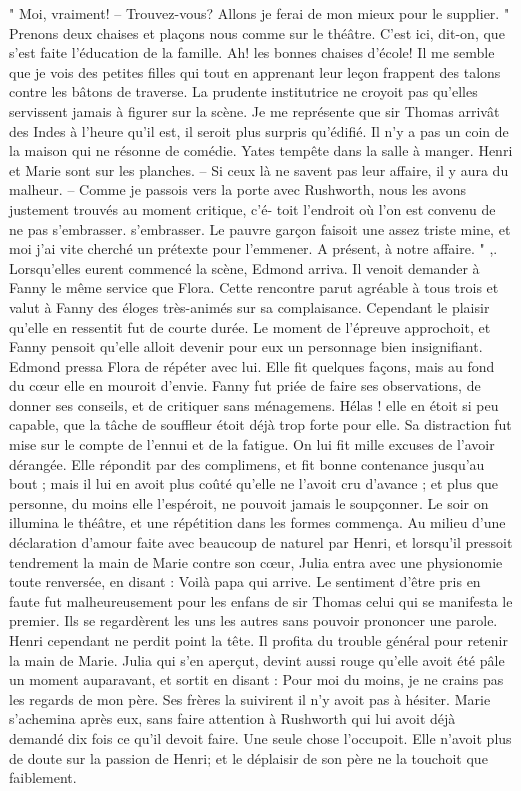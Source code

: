 " Moi, vraiment! – Trouvez-vous? Allons je ferai de mon mieux pour le supplier.
" Prenons deux chaises et plaçons nous comme sur le théâtre. C’est ici, dit-on, que s’est faite l’éducation de la famille. Ah! les bonnes chaises d’école! Il me semble que je vois des petites filles qui tout en apprenant leur leçon frappent des talons contre les bâtons de traverse. La prudente institutrice ne croyoit pas qu’elles servissent jamais à figurer sur la scène. Je me représente que sir Thomas arrivât des Indes à l’heure qu’il est, il seroit plus surpris qu’édifié. Il n’y a pas un coin de la maison qui ne résonne de comédie. Yates tempête dans la salle à manger. Henri et Marie sont sur les planches. – Si ceux là ne savent pas leur affaire, il y aura du malheur. – Comme je passois vers la porte avec Rushworth, nous les avons justement trouvés au moment critique, c’é- toit l’endroit où l’on est convenu de ne pas s’embrasser.\setcounter{page}{129} s'embrasser. Le pauvre garçon faisoit une assez triste mine, et moi j'ai vite cherché un prétexte pour l'emmener. A présent, à notre affaire. "
,. Lorsqu'elles eurent commencé la scène, Edmond arriva. Il venoit demander à Fanny le même service que Flora. Cette rencontre parut agréable à tous trois et valut à Fanny des éloges très-animés sur sa complaisance. Cependant le plaisir qu'elle en ressentit fut de courte durée. Le moment de l'épreuve approchoit, et Fanny pensoit qu'elle alloit devenir pour eux un personnage bien insignifiant. Edmond pressa Flora de répéter avec lui. Elle fit quelques façons, mais au fond du cœur elle en mouroit d'envie. Fanny fut priée de faire ses observations, de donner ses conseils, et de critiquer sans ménagemens. Hélas ! elle en étoit si peu capable, que la tâche de souffleur étoit déjà trop forte pour elle. Sa distraction fut mise sur le compte de l'ennui et de la fatigue. On lui fit mille excuses de l'avoir dérangée. Elle répondit par des complimens, et fit bonne contenance jusqu'au bout ; mais il lui en avoit plus coûté qu'elle ne l'avoit cru d'avance ; et plus que personne, du moins elle l'espéroit, ne pouvoit jamais le soupçonner.\setcounter{page}{130} Le soir on illumina le théâtre, et une répétition dans les formes commença. Au milieu d'une déclaration d'amour faite avec beaucoup de naturel par Henri, et lorsqu'il pressoit tendrement la main de Marie contre son cœur, Julia entra avec une physionomie toute renversée, en disant : Voilà papa qui arrive.
Le sentiment d'être pris en faute fut malheureusement pour les enfans de sir Thomas celui qui se manifesta le premier. Ils se regardèrent les uns les autres sans pouvoir prononcer une parole. Henri cependant ne perdit point la tête. Il profita du trouble général pour retenir la main de Marie. Julia qui s'en aperçut, devint aussi rouge qu'elle avoit été pâle un moment auparavant, et sortit en disant : Pour moi du moins, je ne crains pas les regards de mon père. Ses frères la suivirent il n'y avoit pas à hésiter. Marie s'achemina après eux, sans faire attention à Rushworth qui lui avoit déjà demandé dix fois ce qu'il devoit faire. Une seule chose l'occupoit. Elle n'avoit plus de doute sur la passion de Henri; et le déplaisir de son père ne la touchoit que faiblement.
